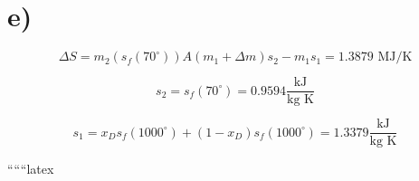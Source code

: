 

\section*{e)}

\[
\Delta S = m_2 \left( s_f \left( 70^\circ \right) \right) A (m_1 + \Delta m) s_2 - m_1 s_1 = 1.3879 \text{ MJ/K}
\]

\[
s_2 = s_f \left( 70^\circ \right) = 0.9594 \frac{\text{kJ}}{\text{kg K}}
\]

\[
s_1 = x_D s_f \left( 1000^\circ \right) + (1 - x_D) s_f \left( 1000^\circ \right) = 1.3379 \frac{\text{kJ}}{\text{kg K}}
\]

``````latex
